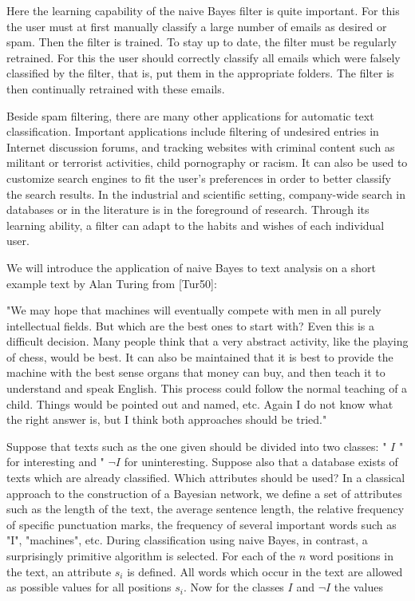 \documentclass[10pt]{article}
\begin{document}
Here the learning capability of the naive Bayes filter is quite important. For this the user must at first manually classify a large number of emails as desired or spam. Then the filter is trained. To stay up to date, the filter must be regularly retrained. For this the user should correctly classify all emails which were falsely classified by the filter, that is, put them in the appropriate folders. The filter is then continually retrained with these emails.

Beside spam filtering, there are many other applications for automatic text classification. Important applications include filtering of undesired entries in Internet discussion forums, and tracking websites with criminal content such as militant or terrorist activities, child pornography or racism. It can also be used to customize search engines to fit the user's preferences in order to better classify the search results. In the industrial and scientific setting, company-wide search in databases or in the literature is in the foreground of research. Through its learning ability, a filter can adapt to the habits and wishes of each individual user.

We will introduce the application of naive Bayes to text analysis on a short example text by Alan Turing from [Tur50]:

\begin{displayquote}
"We may hope that machines will eventually compete with men in all purely intellectual fields. But which are the best ones to start with? Even this is a difficult decision. Many people think that a very abstract activity, like the playing of chess, would be best. It can also be maintained that it is best to provide the machine with the best sense organs that money can buy, and then teach it to understand and speak English. This process could follow the normal teaching of a child. Things would be pointed out and named, etc. Again I do not know what the right answer is, but I think both approaches should be tried."
\end{displayquote}

Suppose that texts such as the one given should be divided into two classes: " $I$ " for interesting and " $\neg I$ for uninteresting. Suppose also that a database exists of texts which are already classified. Which attributes should be used? In a classical approach to the construction of a Bayesian network, we define a set of attributes such as the length of the text, the average sentence length, the relative frequency of specific punctuation marks, the frequency of several important words such as "I", "machines", etc. During classification using naive Bayes, in contrast, a surprisingly primitive algorithm is selected. For each of the $n$ word positions in the text, an attribute $s_{i}$ is defined. All words which occur in the text are allowed as possible values for all positions $s_{i}$. Now for the classes $I$ and $\neg I$ the values
\end{document}
